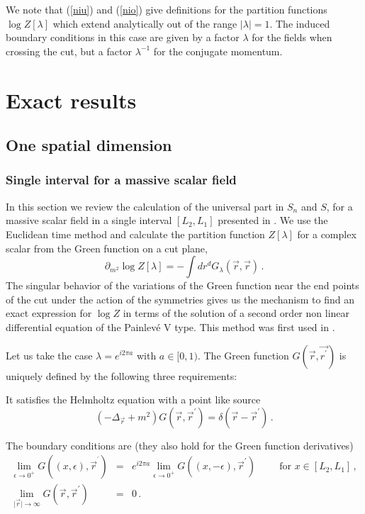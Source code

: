 \documentclass[a4paper]{article}
\begin{document}
We note  that (\ref{niu}) and (\ref{nio}) give definitions for the partition functions $\log Z[\lambda]$ which extend analytically out of the range $|\lambda|=1$. The induced boundary conditions in this case are given by a factor $\lambda$ for the fields when crossing the cut, but a factor $\lambda^{-1}$ for the conjugate momentum.   

\section{Exact results}



\subsection{One spatial dimension}

\subsubsection{Single interval for a massive scalar field}
In this section we review the calculation of the universal part in $S_n$ and $S$, for a massive scalar field in a single interval $[L_2,L_1]$ presented in \cite{boson}. We use the Euclidean time method and
calculate the partition function $Z[\lambda]$ for a complex scalar from the Green function on a cut plane,
\begin{equation}
 \partial_{m^2}\log Z[\lambda]= -\int dr^d G_\lambda(\vec{r},\vec{r})\,.\label{gdgd}
\end{equation} 
 The singular behavior of the variations of the Green function near the end points of the cut under the action of the symmetries gives us the mechanism to find an exact expression for $\log Z$ in terms of the solution of
a second order non linear differential equation of the Painlev\'e V type. This method was first used in \cite{Myers}. 

Let us take the case $\lambda=e^{i 2 \pi a}$ with $a\in[0,1)$. The Green function $G(\vec{r},\vec{r^\prime})$ is uniquely defined by the following three requirements:

 It satisfies the Helmholtz equation with a point like source
\begin{equation}
\left( -\Delta _{\vec{r}}+m^{2}\right) G(\vec{r},\vec{r}^{\prime})=\delta (
\vec{r}-\vec{r}^{\prime})\,. \label{g1}
\end{equation}

 The boundary conditions are (they also hold for the Green function derivatives)
\begin{eqnarray}
\lim_{\epsilon \rightarrow 0^{+}}G((x,\epsilon ),\vec{r}^{^{\prime
}})&=&e^{i2\pi a }\lim_{\epsilon \rightarrow 0^{+}}G((x,-\epsilon ),\vec{r
}^{\prime}) \hspace{1cm} \textrm{for}\,\, x \in [L_{2},L_{1}]\,, \label{bcc1}\\
\lim_{\vert \vec{r} \vert \rightarrow \infty}G(\vec{r},\vec{r}^{\prime
})&=&0 \,.
\end{eqnarray}
\end{document}
